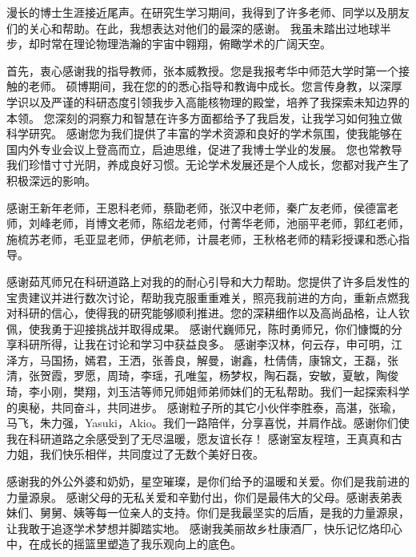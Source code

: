 
\acknowledgements

\iffalse
漫长的博士生涯接近尾声。在研究生学习期间，我得到了许多老师、同学以及朋友们的关心和帮助。在此，我想表达对他们的最深的感谢。
我虽未踏出过地球半步，却时常在理论物理浩瀚的宇宙中翱翔，俯瞰学术的广阔天空。

首先，衷心感谢我的指导教师，张本威教授。您是我报考华中师范大学时第一个接触的老师。
硕博期间，我在您的的悉心指导和教诲中成长。您言传身教，以深厚学识以及严谨的科研态度引领我步入高能核物理的殿堂，培养了我探索未知边界的本领。
您深刻的洞察力和智慧在许多方面都给予了我启发，让我学习如何独立做科学研究。
感谢您为我们提供了丰富的学术资源和良好的学术氛围，使我能够在国内外专业会议上登高而立，启迪思维，促进了我博士学业的发展。
您也常教导我们珍惜寸寸光阴，养成良好习惯。无论学术发展还是个人成长，您都对我产生了积极深远的影响。



感谢王新年老师，王恩科老师，蔡勖老师，张汉中老师，秦广友老师，侯德富老师，刘峰老师，肖博文老师，陈绍龙老师，付菁华老师，池丽平老师，郭红老师，施梳苏老师，毛亚显老师，伊航老师，计晨老师，王秋格老师的精彩授课和悉心指导。

感谢茹芃师兄在科研道路上对我的的耐心引导和大力帮助。您提供了许多启发性的宝贵建议并进行数次讨论，帮助我克服重重难关，照亮我前进的方向，重新点燃我对科研的信心，使得我的研究能够顺利推进。您的深耕细作以及高尚品格，让人钦佩，使我勇于迎接挑战并取得成果。
感谢代巍师兄，陈时勇师兄，你们慷慨的分享科研所得，让我在讨论和学习中获益良多。
感谢李汉林，何云存，申可明，江泽方，马国扬，嫣君，王洒，张善良，解曼，谢鑫，杜倩倩，康锦文，王磊，张清，张贺霞，罗愿，周琦，李瑶，孔唯玺，杨梦权，陶石磊，安敏，夏敏，陶俊琦，李小刚，樊翔，刘玉洁等师兄师姐师弟师妹们的无私帮助。我们一起探索科学的奥秘，共同奋斗，共同进步。
感谢粒子所的其它小伙伴李胜泰，高湛，张瑜，马飞，朱力强，Yasuki，Akio。我们一路陪伴，分享喜悦，并肩作战。感谢你们使我在科研道路之余感受到了无尽温暖，愿友谊长存！
感谢室友程瑄，王真真和古力姐，我们快乐相伴，共同度过了无数个美好日夜。

感谢我的外公外婆和奶奶，星空璀璨，是你们给予的温暖和关爱。你们是我前进的力量源泉。
感谢父母的无私关爱和辛勤付出，你们是最伟大的父母。感谢表弟表妹们、舅舅、姨等每一位亲人的支持。你们是我最坚实的后盾，是我的力量源泉，让我敢于追逐学术梦想并脚踏实地。
感谢我美丽故乡杜康酒厂，快乐记忆烙印心中，在成长的摇篮里塑造了我乐观向上的底色。

